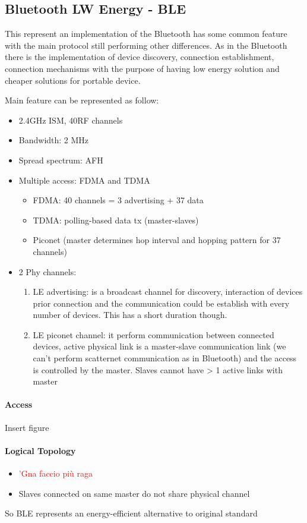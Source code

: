 \subsection{Bluetooth LW Energy - BLE}
This represent an implementation of the Bluetooth has some common feature with the main protocol still performing other differences. As in the Bluetooth there is the implementation of device discovery, connection establishment, connection mechanisms with the purpose of having low energy solution and cheaper solutions for portable device. 

Main feature can be represented as follow:
\begin{itemize}
\item 2.4GHz ISM, 40RF channels
\item Bandwidth: 2 MHz
\item Spread spectrum: AFH
\item Multiple access: FDMA and TDMA
\begin{itemize}
\item FDMA: 40 channels = 3 advertising + 37 data
\item TDMA: polling-based data tx (master-slaves)
\item Piconet (master determines hop interval and hopping pattern for 37 channels)
\end{itemize}
\item 2 Phy channels:
\begin{enumerate}
\item LE advertising: is a broadcast channel for discovery, interaction of devices prior connection and the communication could be establish with every number of devices. This has a short duration though. 
\item LE piconet channel: it perform communication between connected devices, active physical link is a master-slave communication link (we can't perform scatternet communication as in Bluetooth) and the access is controlled by the master. Slaves cannot have > 1 active links with master   
\end{enumerate}
\end{itemize}
\paragraph{Access}
Insert figure
\paragraph{Logical Topology}
\begin{itemize}
\item \textcolor{red}{'Gna faccio più raga}
\item Slaves connected on same master do not share physical channel 
\end{itemize}
So BLE represents an energy-efficient alternative to original standard
















